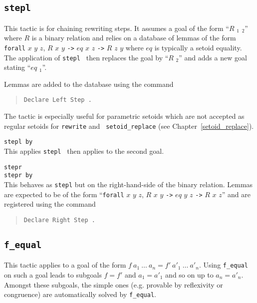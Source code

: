 \subsection[{\tt stepl {\term}}]{{\tt stepl {\term}}}

This tactic is for chaining rewriting steps. It assumes a goal of the
form ``$R$ {\term}$_1$ {\term}$_2$'' where $R$ is a binary relation
and relies on a database of lemmas of the form {\tt forall} $x$ $y$
$z$, $R$ $x$ $y$ {\tt ->} $eq$ $x$ $z$ {\tt ->} $R$ $z$ $y$ where $eq$
is typically a setoid equality. The application of {\tt stepl {\term}}
then replaces the goal by ``$R$ {\term} {\term}$_2$'' and adds a new
goal stating ``$eq$ {\term} {\term}$_1$''.

Lemmas are added to the database using the command 
\begin{quote}
{\tt Declare Left Step {\term}.}
\end{quote}

The tactic is especially useful for parametric setoids which are not
accepted as regular setoids for {\tt rewrite} and {\tt
  setoid\_replace} (see Chapter~\ref{setoid_replace}).

\begin{Variants}
\item{\tt stepl {\term} by {\tac}}\\
This applies {\tt stepl {\term}} then applies {\tac} to the second goal.

\item{\tt stepr {\term}}\\
     {\tt stepr {\term} by {\tac}}\\
This behaves as {\tt stepl} but on the right-hand-side of the binary relation.
Lemmas are expected to be of the form
``{\tt forall} $x$ $y$
$z$, $R$ $x$ $y$ {\tt ->} $eq$ $y$ $z$ {\tt ->} $R$ $x$ $z$''
and are registered using the command
\begin{quote}
{\tt Declare Right Step {\term}.}
\end{quote}
\end{Variants}


\subsection{\tt f\_equal
\label{f-equal}
}

This tactic applies to a goal of the form $f\ a_1\ \ldots\ a_n = f'\
a'_1\ \ldots\ a'_n$. Using {\tt f\_equal} on such a goal leads to
subgoals $f=f'$ and $a_1=a'_1$ and so on up to $a_n=a'_n$. Amongst 
these subgoals, the simple ones (e.g. provable by
reflexivity or congruence) are automatically solved by {\tt f\_equal}.


